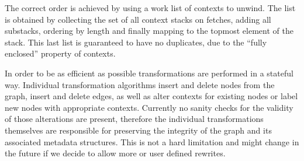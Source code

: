 The correct order is achieved by using a work list of contexts to unwind.
The list is obtained by collecting the set of all context stacks on fetches, adding all substacks, ordering by length and finally mapping to the topmost element of the stack.
This last list is guaranteed to have no duplicates, due to the ``fully enclosed'' property of contexts.

In order to be as efficient as possible transformations are performed in a stateful way.
Individual transformation algorithms insert and delete nodes from the graph, insert and delete edges, as well as alter contexts for existing nodes or label new nodes with appropriate contexts.
Currently no sanity checks for the validity of those alterations are present, therefore the individual transformations themselves are responsible for preserving the integrity of the graph and its associated metadata structures.
This is not a hard limitation and might change in the future if we decide to allow more or user defined rewrites.

